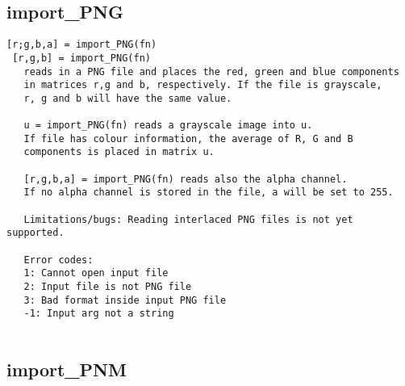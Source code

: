 \documentclass[a4paper]{article}
\begin{document}
\subsection{import\_PNG\label{import_PNG}}

\begin{tscreen}
\begin{verbatim}
[r;g,b,a] = import_PNG(fn)
 [r,g,b] = import_PNG(fn)
   reads in a PNG file and places the red, green and blue components
   in matrices r,g and b, respectively. If the file is grayscale,
   r, g and b will have the same value.

   u = import_PNG(fn) reads a grayscale image into u.
   If file has colour information, the average of R, G and B
   components is placed in matrix u.

   [r,g,b,a] = import_PNG(fn) reads also the alpha channel.
   If no alpha channel is stored in the file, a will be set to 255.

   Limitations/bugs: Reading interlaced PNG files is not yet supported.
   
   Error codes:
   1: Cannot open input file
   2: Input file is not PNG file
   3: Bad format inside input PNG file
   -1: Input arg not a string
 
\end{verbatim}
\end{tscreen}





\subsection{import\_PNM\label{import_PNM}}
\end{document}
